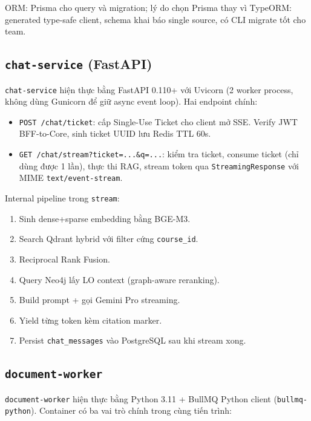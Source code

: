 ORM: Prisma cho query và migration; lý do chọn Prisma thay vì TypeORM:
generated type-safe client, schema khai báo single source, có CLI
migrate tốt cho team.

\subsection{\texttt{chat-service} (FastAPI)}

\texttt{chat-service} hiện thực bằng FastAPI 0.110+ với Uvicorn (2
worker process, không dùng Gunicorn để giữ async event loop). Hai
endpoint chính:

\begin{itemize}
    \item \texttt{POST /chat/ticket}: cấp Single-Use Ticket cho client
          mở SSE. Verify JWT BFF-to-Core, sinh ticket UUID lưu Redis
          TTL 60s.
    \item \texttt{GET /chat/stream?ticket=...\&q=...}: kiểm tra ticket,
          consume ticket (chỉ dùng được 1 lần), thực thi RAG, stream
          token qua \texttt{StreamingResponse} với MIME
          \texttt{text/event-stream}.
\end{itemize}

Internal pipeline trong \texttt{stream}:

\begin{enumerate}
    \item Sinh dense+sparse embedding bằng BGE-M3.
    \item Search Qdrant hybrid với filter cứng \texttt{course\_id}.
    \item Reciprocal Rank Fusion.
    \item Query Neo4j lấy LO context (graph-aware reranking).
    \item Build prompt + gọi Gemini Pro streaming.
    \item Yield từng token kèm citation marker.
    \item Persist \texttt{chat\_messages} vào PostgreSQL sau khi
          stream xong.
\end{enumerate}

\subsection{\texttt{document-worker}}

\texttt{document-worker} hiện thực bằng Python 3.11 + BullMQ Python
client (\texttt{bullmq-python}). Container có ba vai trò chính trong
cùng tiến trình:

